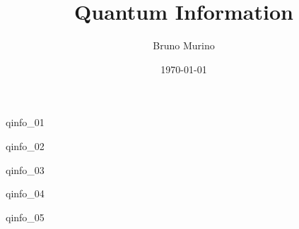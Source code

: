 \documentclass{../_mypackages/monograph}
\title{Quantum Information} %
\author{Bruno Murino} %
\date{\today} %
\begin{document}
\frontmatter

\monographtp
\dominitoc
\doparttoc
\pagestyle{onlypagenum}
\tableofcontents
\mainmatter

{qinfo_01} %

{qinfo_02} %

{qinfo_03} %

{qinfo_04} %

{qinfo_05} %




\backmatter
\printbib
\end{document}
